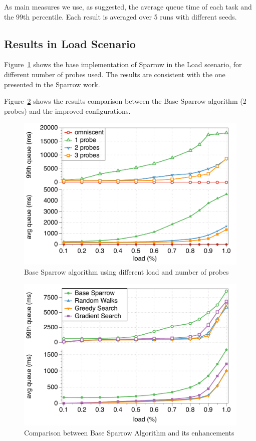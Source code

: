 \documentclass[conference]{IEEEtran}
\begin{document}
  As main measures we use, as suggested, the average queue time of each
  task and the 99th percentile. Each result is averaged over 5 runs with
  different seeds.

\subsection{Results in Load Scenario}

  Figure~\ref{fig:probes} shows the base implementation of Sparrow in the
  Load scenario, for different number of probes used. The results are
  consistent with the one presented in the Sparrow work.

  Figure~\ref{fig:comparison} shows the results comparison between the Base
  Sparrow algorithm (2 probes) and the improved configurations.

  \begin{figure}
  \begin{center}
  \includegraphics[width=.5\textwidth]{figures/probes_new}
  \caption{Base Sparrow algorithm using different load and number of probes}
  \label{fig:probes}
  \end{center}
  \end{figure}

  \begin{figure}
  \begin{center}
  \includegraphics[width=.5\textwidth]{figures/comparison_new}
  \caption{Comparison between Base Sparrow Algorithm and its enhancements}
  \label{fig:comparison}
  \end{center}
  \end{figure}
\end{document}
